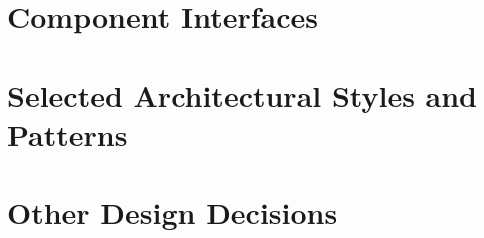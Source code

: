 \clearpage

\section{Component Interfaces}

\section{Selected Architectural Styles and Patterns}

\section{Other Design Decisions}
